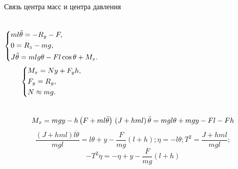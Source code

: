\documentclass[10pt]{beamer}
\begin{document}
\begin{frame}{Связь центра масс и центра давления}
	\begin{columns}
	\begin{equation}\label{koshisystem}
    \left\{ {\begin{aligned}
                 & ml\ddot{\theta} = -R_y-F , \hfill   \\
                 & 0=R_z-mg, \hfill \\
                 & J \ddot{\theta} = mlg\theta-Fl\cos\theta+M_x . \hfill             \\
            \end{aligned}} \right.
\end{equation}
	\begin{equation}\label{koshisystem}
		\left\{ {\begin{aligned}
					 & M_x = Ny+F_yh , \hfill   \\
					 & F_y = R_y , \hfill \\
					 & N \approx mg . \hfill             \\
				\end{aligned}} \right.
	\end{equation}

\end{columns}
\[
	\\
	 M_x=mgy-h\left(F+ml\ddot{\theta}\right) \\
	 \left(J+hml\right)\ddot{\theta}=mgl\theta+mgy-Fl-Fh \\
\]
\[
	\frac{(J+hml)l\ddot{\theta}}{mgl}=l\theta+y-\frac{F}{mg}(l+h); \eta=-l\theta; T^2=\frac{J+hml}{mgl};
\]
$$ -T^2\ddot{\eta}=-\eta+y-\frac{F}{mg}(l+h)$$

\end{frame}
\end{document}
